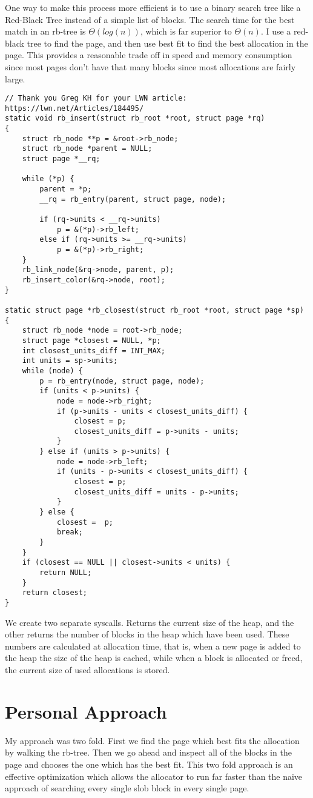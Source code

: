 \documentclass[10pt,conference,draftclsnofoot,onecolumn]{IEEEtran}
\begin{document}
One way to make this process more efficient is to use a binary search tree like a Red-Black Tree instead of a simple list of blocks. The search time for the best match in an rb-tree is $\Theta(log(n))$, which is far superior to $\Theta(n)$. I use a red-black tree to find the page, and then use best fit to find the best allocation in the page. This provides a reasonable trade off in speed and memory consumption since most pages don't have that many blocks since most allocations are fairly large.

\begin{lstlisting}
// Thank you Greg KH for your LWN article: https://lwn.net/Articles/184495/
static void rb_insert(struct rb_root *root, struct page *rq)
{
	struct rb_node **p = &root->rb_node;
	struct rb_node *parent = NULL;
	struct page *__rq;

	while (*p) {
		parent = *p;
		__rq = rb_entry(parent, struct page, node);

		if (rq->units < __rq->units)
			p = &(*p)->rb_left;
		else if (rq->units >= __rq->units)
			p = &(*p)->rb_right;
	}
	rb_link_node(&rq->node, parent, p);
	rb_insert_color(&rq->node, root);
}

static struct page *rb_closest(struct rb_root *root, struct page *sp) {
	struct rb_node *node = root->rb_node;
	struct page *closest = NULL, *p;
	int closest_units_diff = INT_MAX;
	int units = sp->units;
	while (node) {
		p = rb_entry(node, struct page, node);
		if (units < p->units) {
			node = node->rb_right;
			if (p->units - units < closest_units_diff) {
				closest = p;
				closest_units_diff = p->units - units;
			}
		} else if (units > p->units) {
			node = node->rb_left;
			if (units - p->units < closest_units_diff) {
				closest = p;
				closest_units_diff = units - p->units;
			}
		} else {
			closest =  p;
			break;
		}
	}
	if (closest == NULL || closest->units < units) {
		return NULL;
	}
	return closest;
}
\end{lstlisting}

We create two separate syscalls. Returns the current size of the heap, and the other returns the number of blocks in the heap which have been used. These numbers are calculated at allocation time, that is, when a new page is added to the heap the size of the heap is cached, while when a block is allocated or freed, the current size of used allocations is stored.

\section{Personal Approach}
My approach was two fold. First we find the page which best fits the allocation by walking the rb-tree. Then we go ahead and inspect all of the blocks in the page and chooses the one which has the best fit. This two fold approach is an effective optimization which allows the allocator to run far faster than the naive approach of searching every single slob block in every single page.
\end{document}
